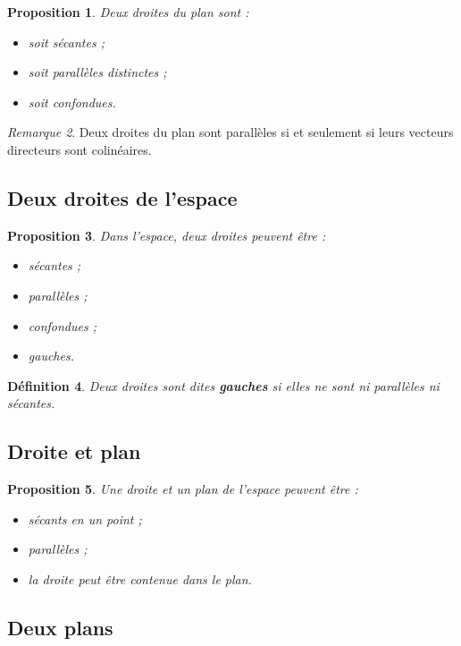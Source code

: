 \documentclass[11pt,a4paper]{article}
\newtheorem{definition}{Définition}[section]
\newtheorem{proposition}[definition]{Proposition}
\theoremstyle{remark}
\newtheorem{remarque}[definition]{Remarque}
\begin{document}
\begin{proposition}
Deux droites du plan sont :
\begin{itemize}
    \item soit sécantes ;
    \item soit parallèles distinctes ;
    \item soit confondues.
\end{itemize}
\end{proposition}

\begin{remarque}
Deux droites du plan sont parallèles si et seulement si leurs vecteurs directeurs sont colinéaires.
\end{remarque}

\subsection{Deux droites de l’espace}

\begin{proposition}
Dans l’espace, deux droites peuvent être :
\begin{itemize}
    \item sécantes ;
    \item parallèles ;
    \item confondues ;
    \item gauches.
\end{itemize}
\end{proposition}

\begin{definition}
Deux droites sont dites \textbf{gauches} si elles ne sont ni parallèles ni sécantes.
\end{definition}

\subsection{Droite et plan}

\begin{proposition}
Une droite et un plan de l’espace peuvent être :
\begin{itemize}
    \item sécants en un point ;
    \item parallèles ;
    \item la droite peut être contenue dans le plan.
\end{itemize}
\end{proposition}

\subsection{Deux plans}
\end{document}
